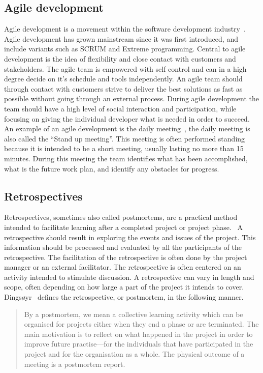 \documentclass[12pt]{article}
\begin{document}
\subsection{Agile development}
Agile development is a movement within the software development industry~\cite{Tessem2014}. Agile development has grown mainstream since it was first introduced, and include variants such as SCRUM and Extreme programming. Central to agile development is the idea of flexibility and close contact with customers and stakeholders. The agile team is empowered with self control and can in a high degree decide on it's schedule and tools independently. An agile team should through contact with customers strive to deliver the best solutions as fast as possible without going through an external process. During agile development the team should have a high level of social interaction and participation, while focusing on giving the individual developer what is needed in order to succeed. An example of an agile development is the daily meeting~\cite{Stray2012}, the daily meeting is also called the ``Stand up meeting''. This meeting is often performed standing because it is intended to be a short meeting, usually lasting no more than 15 minutes. During this meeting the team identifies what has been accomplished, what is the future work plan, and identify any obstacles for progress.

\subsection{Retrospectives}
Retrospectives, sometimes also called postmortems, are a practical method intended to facilitate learning after a completed project or project phase.~\cite{Dingsoyr2005} A retrospective should result in exploring the events and issues of the project. This information should be processed and evaluated by all the participants of the retrospective. The facilitation of the retrospective is often done by the project manager or an external facilitator. The retrospective is often centered on an activity intended to stimulate discussion. A retrospective can vary in length and scope, often depending on how large a part of the project it intends to cover. Dingsøyr~\cite{Dingsoyr2005} defines the retrospective, or postmortem, in the following manner.

\begin{quote} By a postmortem, we mean a collective learning activity
which can be organised for projects either when they end a
phase or are terminated. The main motivation is to reflect on
what happened in the project in order to improve future
practise—for the individuals that have participated in the
project and for the organisation as a whole. The physical
outcome of a meeting is a postmortem report.
\end{quote}
\end{document}
